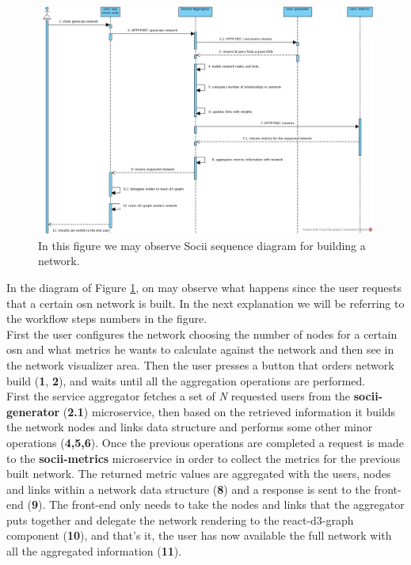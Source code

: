 \begin{figure}[h!]
\begin{center}
  \hspace*{-0.8in}
  \includegraphics[width=1.2\textwidth]{img/socii-sd.jpg}
\end{center}
\caption{\label{img:sociisd} In this figure we may observe Socii sequence diagram for building a network.}
\end{figure}

In the diagram of Figure \ref{img:sociisd}, on may observe what happens since the user requests that a certain \gls{osn} network is built. In the next explanation we will be referring to the workflow steps numbers in the figure.\\
\indent First the user configures the network choosing the number of nodes for a certain \gls{osn} and what metrics he wants to calculate against the network and then see in the network visualizer area. Then the user presses a button that orders network build (\textbf{1}, \textbf{2}), and waits until all the aggregation operations are performed.\\
\indent First the service aggregator fetches a set of \textit{N} requested users from the \textbf{socii-generator} (\textbf{2.1}) microservice, then based on the retrieved information it builds the network nodes and links data structure and performs some other minor operations (\textbf{4,5,6}). Once the previous operations are completed a request is made to the \textbf{socii-metrics} microservice in order to collect the metrics for the previous built network. The returned metric values are aggregated with the users, nodes and links within a network data structure (\textbf{8}) and a response is sent to the front-end (\textbf{9}). The front-end only needs to take the nodes and links that the aggregator puts together and delegate the network rendering to the react-d3-graph component (\textbf{10}), and that's it, the user has now available the full network with all the aggregated information (\textbf{11}).

